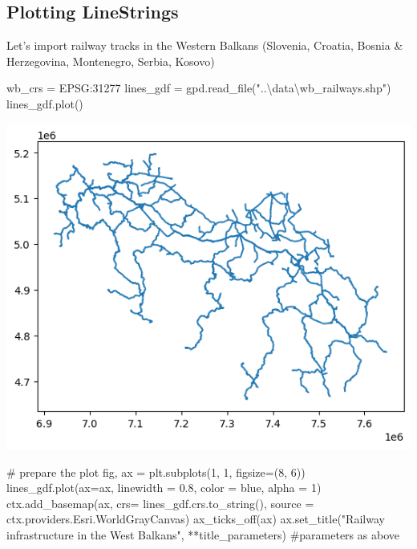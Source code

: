 \documentclass[
  letterpaper,
  DIV=11,
  numbers=noendperiod]{scrreprt}
\newenvironment{Shaded}{\begin{snugshade}}{\end{snugshade}}
\newcommand{\CommentTok}[1]{\textcolor[rgb]{0.37,0.37,0.37}{#1}}
\newcommand{\DecValTok}[1]{\textcolor[rgb]{0.68,0.00,0.00}{#1}}
\newcommand{\FloatTok}[1]{\textcolor[rgb]{0.68,0.00,0.00}{#1}}
\newcommand{\NormalTok}[1]{\textcolor[rgb]{0.00,0.23,0.31}{#1}}
\newcommand{\OperatorTok}[1]{\textcolor[rgb]{0.37,0.37,0.37}{#1}}
\newcommand{\StringTok}[1]{\textcolor[rgb]{0.13,0.47,0.30}{#1}}
\begin{document}
\subsection{Plotting LineStrings}\label{plotting-linestrings}

Let's import railway tracks in the Western Balkans (Slovenia, Croatia,
Bosnia \& Herzegovina, Montenegro, Serbia, Kosovo)

\begin{Shaded}
\begin{Highlighting}[]
\NormalTok{wb\_crs }\OperatorTok{=} \StringTok{\textquotesingle{}EPSG:31277\textquotesingle{}}
\NormalTok{lines\_gdf }\OperatorTok{=}\NormalTok{ gpd.read\_file(}\StringTok{"..\textbackslash{}data\textbackslash{}wb\_railways.shp"}\NormalTok{)}
\NormalTok{lines\_gdf.plot()}
\end{Highlighting}
\end{Shaded}

\includegraphics{labs/w02_maps_files/figure-pdf/cell-10-output-1.png}

\begin{Shaded}
\begin{Highlighting}[]
\CommentTok{\# prepare the plot}
\NormalTok{fig, ax }\OperatorTok{=}\NormalTok{ plt.subplots(}\DecValTok{1}\NormalTok{, }\DecValTok{1}\NormalTok{, figsize}\OperatorTok{=}\NormalTok{(}\DecValTok{8}\NormalTok{, }\DecValTok{6}\NormalTok{))}
\NormalTok{lines\_gdf.plot(ax}\OperatorTok{=}\NormalTok{ax, linewidth }\OperatorTok{=} \FloatTok{0.8}\NormalTok{, color }\OperatorTok{=} \StringTok{\textquotesingle{}blue\textquotesingle{}}\NormalTok{, alpha }\OperatorTok{=} \DecValTok{1}\NormalTok{)}
\NormalTok{ctx.add\_basemap(ax, crs}\OperatorTok{=}\NormalTok{ lines\_gdf.crs.to\_string(), source }\OperatorTok{=}\NormalTok{ ctx.providers.Esri.WorldGrayCanvas)}
\NormalTok{ax\_ticks\_off(ax)}
\NormalTok{ax.set\_title(}\StringTok{"Railway infrastructure in the West Balkans"}\NormalTok{, }\OperatorTok{**}\NormalTok{title\_parameters) }\CommentTok{\#parameters as above}
\end{Highlighting}
\end{Shaded}
\end{document}
